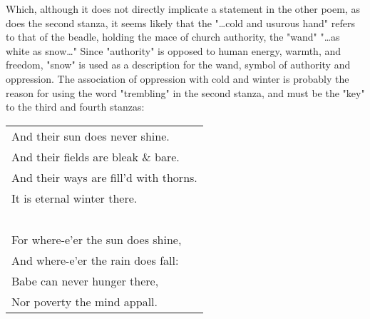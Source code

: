 Which, although it does not directly implicate a statement in the other poem, as does the second stanza, it
seems likely that the "\dots cold and usurous hand" refers to that of the beadle, holding
the mace of church authority, the "wand" "\dots as white as snow\dots" Since "authority" is opposed to human
energy, warmth, and freedom, "snow" is used as a description for the wand, symbol of authority and oppression.
The association of oppression with cold and winter is probably the reason for using the word "trembling" in the 
second stanza, and must be the "key" to the third and fourth stanzas:\par
\begin{center}
	\begin{tabular}{l}
		And their sun does never shine.        \\
		And their fields are bleak \& bare.    \\
		And their ways are fill'd with thorns. \\
		It is eternal winter there.            \\
		~                                      \\
		For where-e'er the sun does shine,     \\
		And where-e'er the rain does fall:     \\
		Babe can never hunger there,           \\
		Nor poverty the mind appall.
	\end{tabular}
\end{center}

\newpage

